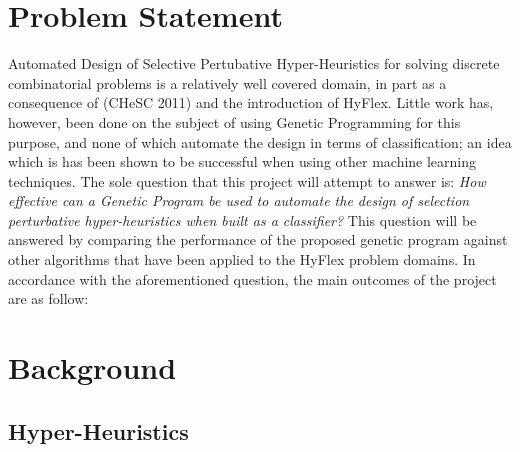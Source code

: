\documentclass[a4paper,12pt]{article}
\begin{document}
\section{Problem Statement} \label{sec:ps}
    \par{
        \noindent
        Automated Design of Selective Pertubative Hyper-Heuristics for solving discrete
        combinatorial problems is a relatively well covered domain, in part as a consequence of (CHeSC 2011) 
        and the introduction of HyFlex. Little work has, however, been done on the subject of 
        using Genetic Programming for this purpose, and none of which automate the design in 
        terms of classification; an idea which is has been shown to be successful when using 
        other machine learning techniques.\newline 
        \newline 
        The sole question that this project will attempt to answer is: \newline 
        \newline 
        \textit{How effective can a Genetic Program be used to automate the design of selection perturbative 
        hyper-heuristics when built as a classifier?}\newline 
        \newline 
        This question will be answered by comparing the performance of the proposed genetic program against other
        algorithms that have been applied to the HyFlex problem domains.\newline 
        \newline 
        In accordance with the aforementioned question, the main outcomes of the
        project are as follow:
    }
    \section{Background} \label{sec:background} 
    \subsection{Hyper-Heuristics}
\end{document}
